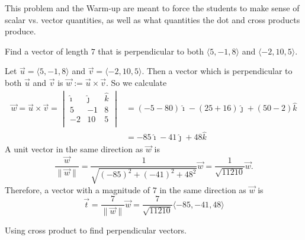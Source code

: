 \documentclass[]{ximera}
\begin{document}
\begin{instructorNotes}
This problem and the Warm-up are meant to force the students to make sense of scalar vs. vector quantities, as well as what quantities the dot and cross products produce.
\end{instructorNotes}







\begin{problem}
Find a vector of length $7$ that is perpendicular to both $\langle 5,-1,8 \rangle$ and $\langle -2,10,5 \rangle$.  
	\begin{freeResponse}
	Let $\vec{u} = \langle 5,-1,8 \rangle$ and $\vec{v} = \langle -2,10,5 \rangle$.
	Then a vector which is perpendicular to both $\vec{u}$ and $\vec{v}$ is $\vec{w} := \vec{u} \times \vec{v}$.  
	So we calculate
		\begin{align*}
		\vec{w} = \vec{u} \times \vec{v} = 
		\begin{vmatrix}
		\hat{\imath}	&	\hat{\jmath}	&	\hat{k}	\\
		5		&	-1		&	8		\\
		-2		&	10		&	5		\\
		\end{vmatrix}
		&= (-5 - 80) \hat{\imath} - (25 + 16) \hat{\jmath} + (50 - 2) \hat{k}  \\
		&= -85 \hat{\imath} -41 \hat{\jmath} + 48 \hat{k}
		\end{align*}
	A unit vector in the same direction as $\vec{w}$ is
		\[
		\frac{\vec{w}}{\| \vec{w} \|}
		= \frac{1}{\sqrt{(-85)^2 + (-41)^2 + 48^2}} \vec{w} = \frac{1}{\sqrt{11210}} \vec{w}.
		\]
	Therefore, a vector with a magnitude of $7$ in the same direction as $\vec{w}$ is
		\[
		\vec{t} = \frac{7}{\| \vec{w} \|} \vec{w} = \boxed{\frac{7}{\sqrt{11210}} \langle -85,-41,48 \rangle}
		\]
	\end{freeResponse}
		
\end{problem}

\begin{instructorNotes}
Using cross product to find perpendicular vectors. 
\end{instructorNotes}
\end{document}
